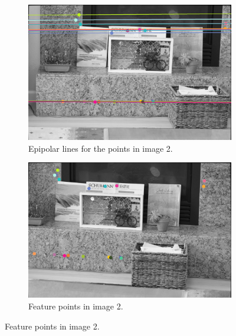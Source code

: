 \documentclass[a4paper]{article}
\begin{document}
\begin{figure}
    \centering
    \begin{subfigure}[b]{0.45\textwidth}
        \includegraphics[width=\textwidth]{../epi3}
        \caption{Epipolar lines for the points in image 2.}
        \label{fig:epi_c}
    \end{subfigure}
    \begin{subfigure}[b]{0.45\textwidth}
        \includegraphics[width=\textwidth]{../epi4}
        \caption{Feature points in image 2.}
        \label{fig:epi_d}
    \end{subfigure}
\end{figure}
\end{document}
